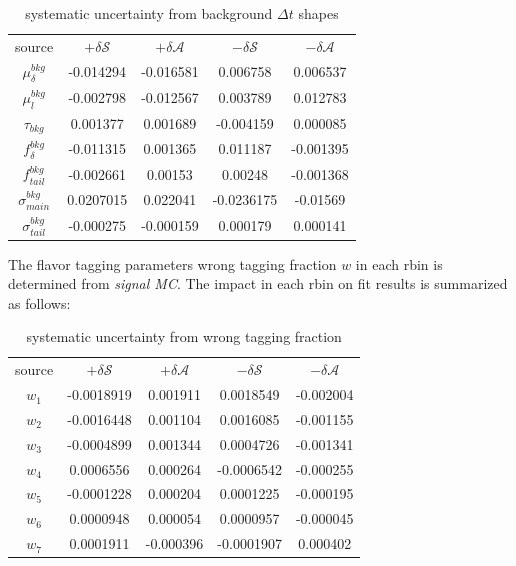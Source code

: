 \begin{table}[H]
	\begin{minipage}[b]{1.0\linewidth}
		\centering
		\caption{systematic uncertainty from background $\Delta t$ shapes}
		\begin{tabular}{c c c c c}
			\hline
			source & $+\delta \mathcal{S}$ & $+\delta \mathcal{A}$ & $-\delta \mathcal{S}$ &  $-\delta \mathcal{A}$\\
			$\mu^{bkg}_{\delta}$ & -0.014294
			& -0.016581
			& 0.006758
			& 0.006537
			\\
			$\mu^{bkg}_{l}$&  -0.002798
			& -0.012567
			& 0.003789
			& 0.012783
			\\
			$\tau_{bkg}$ & 0.001377
			& 0.001689
			& -0.004159
			& 0.000085\\
			$f_{\delta}^{bkg}$ &  -0.011315
			& 0.001365
			& 0.011187
			& -0.001395
			\\
			$f^{bkg}_{tail}$  &-0.002661
			& 0.00153
			& 0.00248
			& -0.001368
			\\
			$\sigma^{bkg}_{main}$ & 0.0207015
			& 0.022041
			& -0.0236175
			& -0.01569
			\\
			$\sigma^{bkg}_{tail}$ & -0.000275 & -0.000159
			& 0.000179
			& 0.000141
			\\
			\hline
		\end{tabular}
	\end{minipage}
\end{table}
The flavor tagging parameters wrong tagging fraction $ w$ in each rbin is determined from \textit{signal MC}. The impact in each rbin on fit results is summarized as follows: 
\begin{table}[H]
	\begin{minipage}[b]{1.0\linewidth}
		\centering
		\caption{systematic uncertainty from wrong tagging fraction}
		\begin{tabular}{c c c c c}
			\hline
			source & $+\delta \mathcal{S}$ & $+\delta \mathcal{A}$ & $-\delta \mathcal{S}$ &  $-\delta \mathcal{A}$\\
			$w_1$ & -0.0018919
			& 0.001911
			& 0.0018549
			& -0.002004
			\\
			$ w_2$ & -0.0016448
			& 0.001104
			& 0.0016085
			& -0.001155
			\\
			$ w_3$ & -0.0004899
			& 0.001344
			& 0.0004726
			& -0.001341
			\\
			$ w_4$ & 0.0006556
			& 0.000264
			& -0.0006542
			& -0.000255 \\
			$ w_5$ & -0.0001228
			& 0.000204
			& 0.0001225 &
			-0.000195
			\\
			$ w_6$ & 0.0000948 & 0.000054 & 0.0000957 & -0.000045 \\
			$ w_7$ & 0.0001911
			& -0.000396
			& -0.0001907
			& 0.000402
			\\
			\hline
		\end{tabular}
	\end{minipage}
\end{table}

